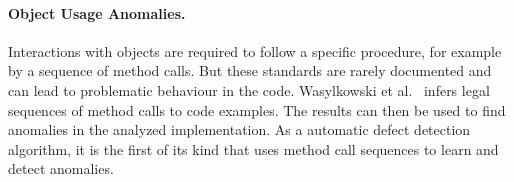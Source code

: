 \paragraph{Object Usage Anomalies.}
Interactions with objects are required to follow a specific procedure, for example by a sequence of method calls. But these standards are rarely documented and can lead to problematic behaviour in the code. Wasylkowski et al.~\cite{object_usage} infers legal sequences of method calls to code examples. The results can then be used to find anomalies in the analyzed implementation. As a automatic defect detection algorithm, it is the first of its kind that uses method call sequences to learn and detect anomalies.